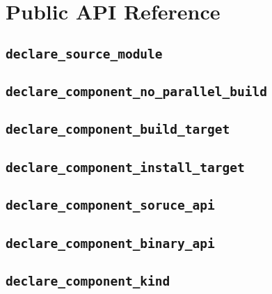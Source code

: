 %
%
%
%
\chapter{Public API Reference}
\section{\texttt{declare\_source\_module}}

\section{\texttt{declare\_component\_no\_parallel\_build}}\label{api:declare-component-no-parallel-build}
\section{\texttt{declare\_component\_build\_target}}\label{api:declare-component-build-target}
\section{\texttt{declare\_component\_install\_target}}\label{api:declare-component-install-target}
\section{\texttt{declare\_component\_soruce\_api}}\label{api:declare-component-source-api}
\section{\texttt{declare\_component\_binary\_api}}\label{api:declare-component-binary-api}
\section{\texttt{declare\_component\_kind}}\label{api:declare-component-kind}

